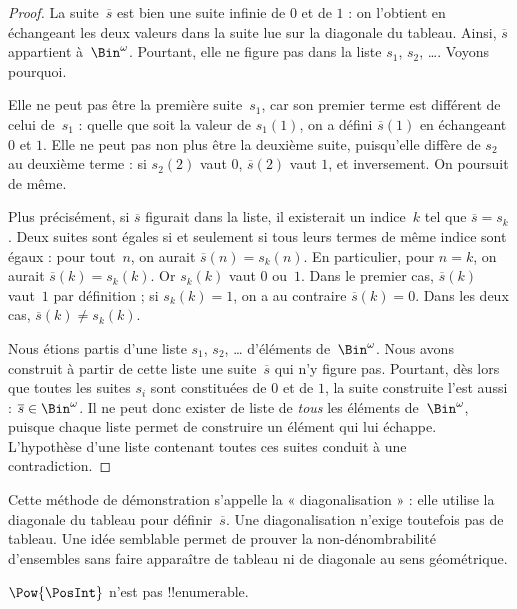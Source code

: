 \documentclass[11pt,a4paper,openany]{memoir}
\begin{document}
\begin{proof}
La suite~$\overline{s}$ est bien une suite infinie de $0$ et de $1$ :
on l’obtient en échangeant les deux valeurs dans la suite lue
sur la diagonale du tableau. Ainsi, $\overline{s}$ appartient
à~$\Bin^\omega$. Pourtant, elle ne figure pas dans la liste
$s_1$, $s_2$, \dots. Voyons pourquoi.

Elle ne peut pas être la première suite~$s_1$, car son premier
terme est différent de celui de~$s_1$ : quelle que soit la valeur
de $s_1(1)$, on a défini $\overline{s}(1)$ en échangeant $0$ et $1$.
Elle ne peut pas non plus être la deuxième suite, puisqu’elle
diffère de $s_2$ au deuxième terme : si $s_2(2)$ vaut $0$,
$\overline{s}(2)$ vaut $1$, et inversement. On poursuit de même.

Plus précisément, si $\overline{s}$ figurait dans la liste,
il existerait un indice~$k$ tel que $\overline{s} = s_{k}$.
Deux suites sont égales si et seulement si tous leurs termes
de même indice sont égaux : pour tout~$n$, on aurait
$\overline{s}(n) = s_{k}(n)$. En particulier, pour $n = k$,
on aurait $\overline{s}(k) = s_{k}(k)$. Or $s_k(k)$ vaut $0$ ou~$1$.
Dans le premier cas, $\overline{s}(k)$ vaut~$1$ par définition ;
si $s_k(k) = 1$, on a au contraire $\overline{s}(k) = 0$.
Dans les deux cas,
$\overline{s}(k) \neq s_{k}(k)$.

Nous étions partis d’une liste $s_1$, $s_2$, \dots{} d’éléments
de~$\Bin^\omega$. Nous avons construit à partir de cette liste
une suite~$\overline{s}$ qui n’y figure pas. Pourtant, dès lors
que toutes les suites $s_i$ sont constituées de $0$ et de $1$,
la suite construite l’est aussi : $\overline{s} \in \Bin^\omega$.
Il ne peut donc exister de liste de \emph{tous} les éléments
de~$\Bin^\omega$, puisque chaque liste permet de construire
un élément qui lui échappe. L’hypothèse d’une liste contenant
toutes ces suites conduit à une contradiction.
\end{proof}

\begin{explain}
Cette méthode de démonstration s’appelle la « diagonalisation » :
elle utilise la diagonale du tableau pour définir~$\overline{s}$.
Une diagonalisation n’exige toutefois pas de tableau. Une idée
semblable permet de prouver la non-dénombrabilité d’ensembles
sans faire apparaître de tableau ni de diagonale au sens géométrique.
\end{explain}

\begin{thm}
$\Pow{\PosInt}$ n’est pas !!{enumerable}.
\end{thm}
\end{document}
